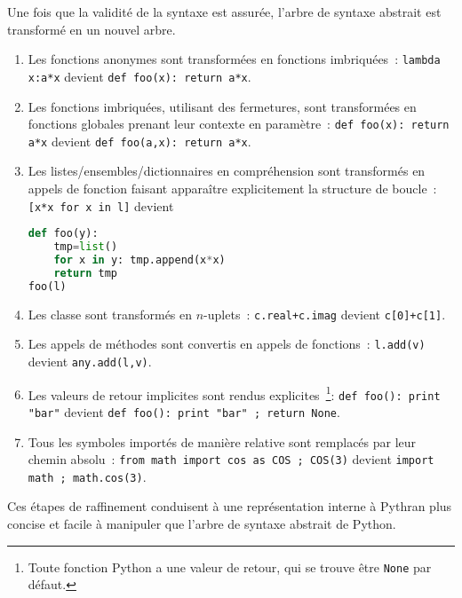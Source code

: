 \documentclass[renpar]{compas2013}
\begin{document}
Une fois que la validité de la syntaxe est assurée, l'arbre de syntaxe
abstrait est transformé en un nouvel arbre.
\begin{enumerate}

  \item Les fonctions anonymes sont transformées en fonctions imbriquées~:
	\texttt{lambda x:a*x} devient \texttt{def foo(x): return a*x}.

  \item Les fonctions imbriquées, utilisant des fermetures, sont
	transformées en fonctions globales prenant leur contexte en
	paramètre~: \texttt{def foo(x): return a*x} devient \texttt{def
	foo(a,x): return a*x}.

  \item Les listes/ensembles/dictionnaires en compréhension sont
	transformés en appels de fonction faisant apparaître explicitement la
	structure de boucle~:\texttt{[x*x for x in l]} devient
\begin{lstlisting}[language=python]
def foo(y):
	tmp=list()
	for x in y: tmp.append(x*x)
	return tmp
foo(l)
\end{lstlisting}

  \item Les classe sont transformés en $n$-uplets~:
	\texttt{c.real+c.imag} devient \texttt{c[0]+c[1]}.

  \item Les appels de méthodes sont convertis en appels de fonctions~:
	\texttt{l.add(v)} devient \texttt{any.add(l,v)}.

  \item Les valeurs de retour implicites sont rendus
	explicites~\footnote{Toute fonction Python a une valeur de retour, qui
	se trouve être \texttt{None} par défaut.}: \texttt{def foo(): print
	"bar"} devient \texttt{def foo(): print "bar" ; return None}.

  \item Tous les symboles importés de manière relative sont remplacés par
	leur chemin absolu~: \texttt{from math import cos as COS ; COS(3)}
	devient \texttt{import math ; math.cos(3)}.

\end{enumerate}

Ces étapes de raffinement conduisent à une représentation interne à
Pythran plus concise et facile à manipuler que l'arbre de syntaxe abstrait
de Python. 
\end{document}
